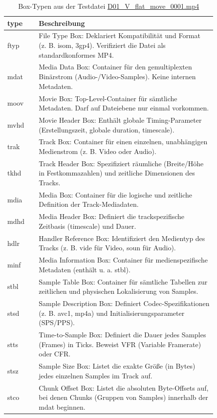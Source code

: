 
\begin{table}[H]
    \centering
\caption{Box-Typen aus der Testdatei \url{D01_V_flat_move_0001.mp4}}
\label{tab:placeholder}
    \begin{tabular}{|l|>{\raggedright\arraybackslash}p{0.85\linewidth}|}\hline
         \textbf{type}& \textbf{Beschreibung}
\\\hline
         ftyp& File Type Box: Deklariert Kompatibilität und Format (z. B. isom, 3gp4). Verifiziert die Datei als standardkonformes MP4.
\\\hline
         mdat& Media Data Box: Container für den gemultiplexten Binärstrom (Audio-/Video-Samples). Keine internen Metadaten.
\\\hline
         moov& Movie Box: Top-Level-Container für sämtliche Metadaten. Darf auf Dateiebene nur einmal vorkommen.
\\\hline
         mvhd& Movie Header Box: Enthält globale Timing-Parameter (Erstellungszeit, globale duration, timescale).
\\\hline
         trak& Track Box: Container für einen einzelnen, unabhängigen Medienstrom (z. B. Video oder Audio).
\\\hline
         tkhd& Track Header Box: Spezifiziert räumliche (Breite/Höhe in Festkommazahlen) und zeitliche Dimensionen des Tracks.
\\\hline
         mdia& Media Box: Container für die logische und zeitliche Definition der Track-Mediadaten.
\\\hline
         mdhd& Media Header Box: Definiert die trackspezifische Zeitbasis (timescale) und Dauer.
\\\hline
         hdlr& Handler Reference Box: Identifiziert den Medientyp des Tracks (z. B. vide für Video, soun für Audio).
\\ \hline
 minf&Media Information Box: Container für medienspezifische Metadaten (enthält u. a. stbl).
\\\hline
 stbl&Sample Table Box: Container für sämtliche Tabellen zur zeitlichen und physischen Lokalisierung von Samples.
\\\hline
 stsd&Sample Description Box: Definiert Codec-Spezifikationen (z. B. avc1, mp4a) und Initialisierungsparameter (SPS/PPS).
\\\hline
 stts&Time-to-Sample Box: Definiert die Dauer jedes Samples (Frames) in Ticks. Beweist VFR (Variable Framerate) oder CFR.
\\\hline
 stsz&Sample Size Box: Listet die exakte Größe (in Bytes) jedes einzelnen Samples im Track auf.
\\\hline
 stco&Chunk Offset Box: Listet die absoluten Byte-Offsets auf, bei denen Chunks (Gruppen von Samples) innerhalb der mdat beginnen.\\\hline
    \end{tabular}
    
    
\end{table}
